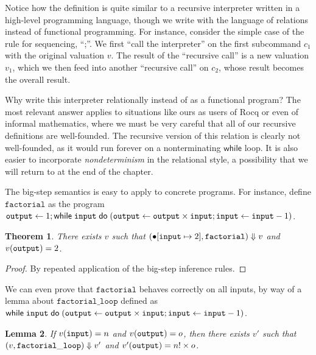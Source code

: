 \documentclass{amsbook}
\newtheorem{theorem}{Theorem}[chapter]
\newtheorem{lemma}[theorem]{Lemma}
\theoremstyle{definition}
\theoremstyle{remark}
\numberwithin{section}{chapter}
\numberwithin{equation}{chapter}
\begin{document}
Notice how the definition is quite similar to a recursive interpreter written in a high-level programming language, though we write with the language of relations instead of functional programming.
For instance, consider the simple case of the rule for sequencing, ``;''.
We first ``call the interpreter'' on the first subcommand $c_1$ with the original valuation $v$.
The result of the ``recursive call'' is a new valuation $v_1$, which we then feed into another ``recursive call'' on $c_2$, whose result becomes the overall result.

Why write this interpreter relationally instead of as a functional program?
The most relevant answer applies to situations like ours as users of Rocq or even of informal mathematics, where we must be very careful that all of our recursive definitions are well-founded.
The recursive version of this relation is clearly not well-founded, as it would run forever on a nonterminating $\mathsf{while}$ loop.
It is also easier to incorporate \emph{nondeterminism} in the relational style, a possibility that we will return to at the end of the chapter.

The big-step semantics is easy to apply to concrete programs.
For instance, define $\mathtt{factorial}$ as the program $\mathtt{output} \leftarrow 1; \mathsf{while} \; \mathtt{input} \; \mathsf{do} \; (\mathtt{output} \leftarrow \mathtt{output} \times \mathtt{input}; \mathtt{input} \leftarrow \mathtt{input} - 1)$.

\begin{theorem}
  There exists $v$ such that $(\bullet[\mathtt{input} \mapsto 2], \mathtt{factorial}) \Downarrow v$ and $v(\mathtt{output}) = 2$.
\end{theorem}

\begin{proof}
  By repeated application of the big-step inference rules.
\end{proof}

We can even prove that $\mathtt{factorial}$ behaves correctly on all inputs, by way of a lemma about $\mathtt{factorial\_loop}$ defined as $\mathsf{while} \; \mathtt{input} \; \mathsf{do} \; (\mathtt{output} \leftarrow \mathtt{output} \times \mathtt{input}; \mathtt{input} \leftarrow \mathtt{input} - 1)$.

\begin{lemma}\label{factorial_loop}
  If $v(\mathtt{input}) = n$ and $v(\mathtt{output}) = o$, then there exists $v'$ such that $(v, \mathtt{factorial\_loop}) \Downarrow v'$ and $v'(\mathtt{output}) = n! \times o$.
\end{lemma}
\end{document}
